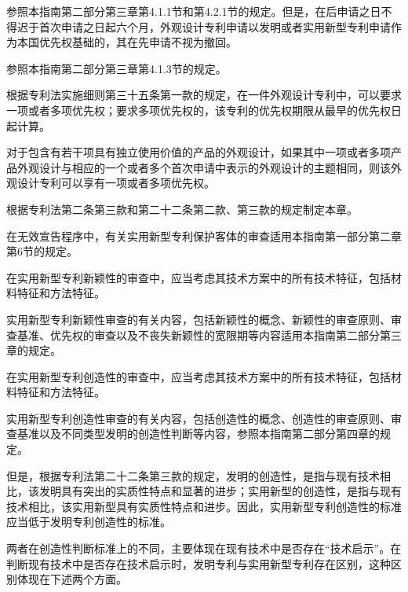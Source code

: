 参照本指南第二部分第三章第4.1.1节和第4.2.1节的规定。但是，在后申请之日不得迟于首次申请之日起六个月，外观设计专利申请以发明或者实用新型专利申请作为本国优先权基础的，其在先申请不视为撤回。

参照本指南第二部分第三章第4.1.3节的规定。

根据专利法实施细则第三十五条第一款的规定，在一件外观设计专利中，可以要求一项或者多项优先权；要求多项优先权的，该专利的优先权期限从最早的优先权日起计算。

对于包含有若干项具有独立使用价值的产品的外观设计，如果其中一项或者多项产品外观设计与相应的一个或者多个首次申请中表示的外观设计的主题相同，则该外观设计专利可以享有一项或者多项优先权。

根据专利法第二条第三款和第二十二条第二款、第三款的规定制定本章。

在无效宣告程序中，有关实用新型专利保护客体的审查适用本指南第一部分第二章第6节的规定。

在实用新型专利新颖性的审查中，应当考虑其技术方案中的所有技术特征，包括材料特征和方法特征。

实用新型专利新颖性审查的有关内容，包括新颖性的概念、新颖性的审查原则、审查基准、优先权的审查以及不丧失新颖性的宽限期等内容适用本指南第二部分第三章的规定。

在实用新型专利创造性的审查中，应当考虑其技术方案中的所有技术特征，包括材料特征和方法特征。

实用新型专利创造性审查的有关内容，包括创造性的概念、创造性的审查原则、审查基准以及不同类型发明的创造性判断等内容，参照本指南第二部分第四章的规定。

但是，根据专利法第二十二条第三款的规定，发明的创造性，是指与现有技术相比，该发明具有突出的实质性特点和显著的进步；实用新型的创造性，是指与现有技术相比，该实用新型具有实质性特点和进步。因此，实用新型专利创造性的标准应当低于发明专利创造性的标准。

两者在创造性判断标准上的不同，主要体现在现有技术中是否存在“技术启示”。在判断现有技术中是否存在技术启示时，发明专利与实用新型专利存在区别，这种区别体现在下述两个方面。

